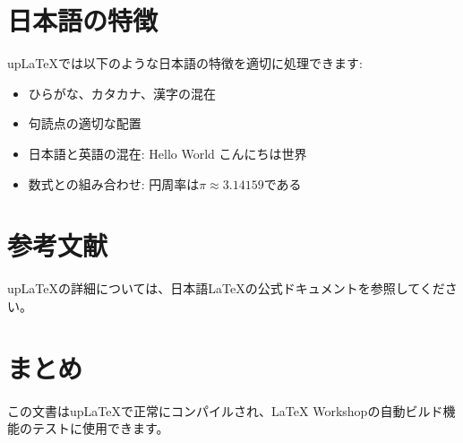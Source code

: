 \documentclass[a4paper,12pt]{ujarticle}
\begin{document}
\section{日本語の特徴}

upLaTeXでは以下のような日本語の特徴を適切に処理できます:

\begin{itemize}
    \item ひらがな、カタカナ、漢字の混在
    \item 句読点の適切な配置
    \item 日本語と英語の混在: Hello World こんにちは世界
    \item 数式との組み合わせ: 円周率は$\pi \approx 3.14159$である
\end{itemize}



\section{参考文献}

upLaTeXの詳細については、日本語LaTeXの公式ドキュメントを参照してください。




\section{まとめ}

この文書はupLaTeXで正常にコンパイルされ、LaTeX Workshopの自動ビルド機能のテストに使用できます。
\end{document}
